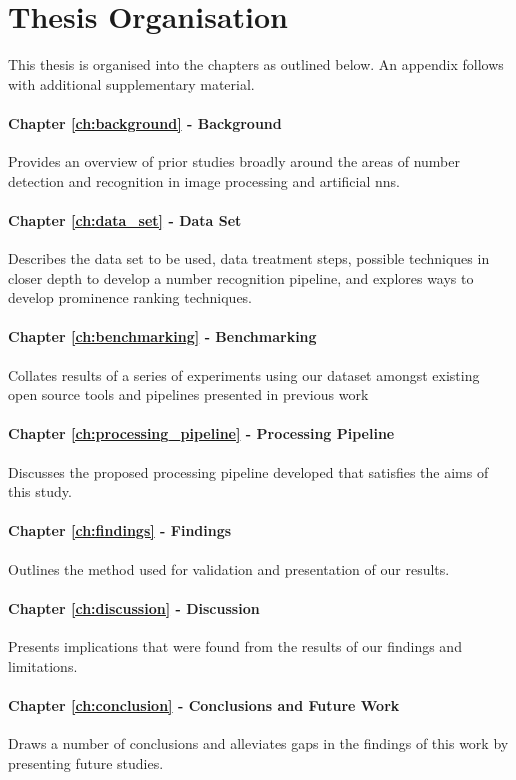 \section{Thesis Organisation}
\label{sec:introduction:organisation}

This thesis is organised into the chapters as outlined below. An appendix follows with additional supplementary material.

\paragraph{Chapter \ref{ch:background} - Background} Provides an overview of prior studies broadly around the areas of number detection and recognition in image processing and artificial \glspl{nn}.

\paragraph{Chapter \ref{ch:data_set} - Data Set} Describes the data set to be used, data treatment steps, possible techniques in closer depth to develop a number recognition pipeline, and explores ways to develop prominence ranking techniques.

\paragraph{Chapter \ref{ch:benchmarking} - Benchmarking} Collates results of a series of experiments using our dataset amongst existing open source tools and pipelines presented in previous work

\paragraph{Chapter \ref{ch:processing_pipeline} - Processing Pipeline} Discusses the proposed processing pipeline developed that satisfies the aims of this study.

\paragraph{Chapter \ref{ch:findings} - Findings} Outlines the method used for validation and presentation of our results.

\paragraph{Chapter \ref{ch:discussion} - Discussion} Presents implications that were found from the results of our findings and limitations.

\paragraph{Chapter \ref{ch:conclusion} - Conclusions and Future Work} Draws a number of conclusions and alleviates gaps in the findings of this work by presenting future studies.